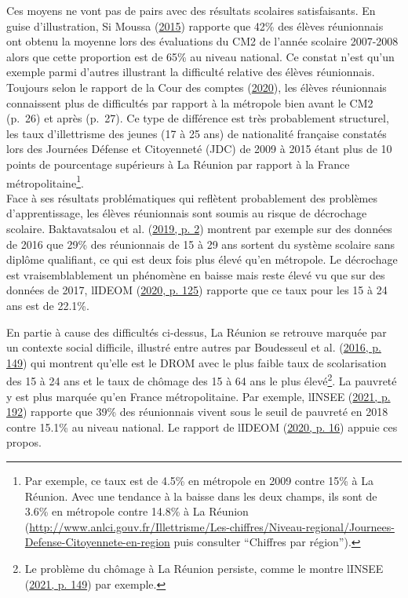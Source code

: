 \documentclass[
]{book}
\begin{document}
\quad Ces moyens ne vont pas de pairs avec des résultats scolaires satisfaisants. En guise d'illustration, Si Moussa (\protect\hyperlink{ref-SIM:15}{2015}) rapporte que 42\% des élèves réunionnais ont obtenu la moyenne lors des évaluations du CM2 de l'année scolaire 2007-2008 alors que cette proportion est de 65\% au niveau national. Ce constat n'est qu'un exemple parmi d'autres illustrant la difficulté relative des élèves réunionnais. Toujours selon le rapport de la Cour des comptes (\protect\hyperlink{ref-COU:20}{2020}), les élèves réunionnais connaissent plus de difficultés par rapport à la métropole bien avant le CM2 (p.~26) et après (p.~27). Ce type de différence est très probablement structurel, les taux d'illettrisme des jeunes (17 à 25 ans) de nationalité française constatés lors des Journées Défense et Citoyenneté (JDC) de 2009 à 2015 étant plus de 10 points de pourcentage supérieurs à La Réunion par rapport à la France métropolitaine\footnote{Par exemple, ce taux est de 4.5\% en métropole en 2009 contre 15\% à La Réunion. Avec une tendance à la baisse dans les deux champs, ils sont de 3.6\% en métropole contre 14.8\% à La Réunion (\url{http://www.anlci.gouv.fr/Illettrisme/Les-chiffres/Niveau-regional/Journees-Defense-Citoyennete-en-region} puis consulter ``Chiffres par région'').}.\\
Face à ses résultats problématiques qui reflètent probablement des problèmes d'apprentissage, les élèves réunionnais sont soumis au risque de décrochage scolaire. Baktavatsalou et al. (\protect\hyperlink{ref-BAK:eal:19}{2019, p. 2}) montrent par exemple sur des données de 2016 que 29\% des réunionnais de 15 à 29 ans sortent du système scolaire sans diplôme qualifiant, ce qui est deux fois plus élevé qu'en métropole. Le décrochage est vraisemblablement un phénomène en baisse mais reste élevé vu que sur des données de 2017, l\textquotesingle{}IDEOM (\protect\hyperlink{ref-IDE:20}{2020, p. 125}) rapporte que ce taux pour les 15 à 24 ans est de 22.1\%.

\quad En partie à cause des difficultés ci-dessus, La Réunion se retrouve marquée par un contexte social difficile, illustré entre autres par Boudesseul et al. (\protect\hyperlink{ref-BOU:eal:16}{2016, p. 149}) qui montrent qu'elle est le DROM avec le plus faible taux de scolarisation des 15 à 24 ans et le taux de chômage des 15 à 64 ans le plus élevé\footnote{Le problème du chômage à La Réunion persiste, comme le montre l\textquotesingle{}INSEE (\protect\hyperlink{ref-INS:21}{2021, p. 149}) par exemple.}. La pauvreté y est plus marquée qu'en France métropolitaine. Par exemple, l\textquotesingle{}INSEE (\protect\hyperlink{ref-INS:21}{2021, p. 192}) rapporte que 39\% des réunionnais vivent sous le seuil de pauvreté en 2018 contre 15.1\% au niveau national. Le rapport de l\textquotesingle{}IDEOM (\protect\hyperlink{ref-IDE:20}{2020, p. 16}) appuie ces propos.
\end{document}
